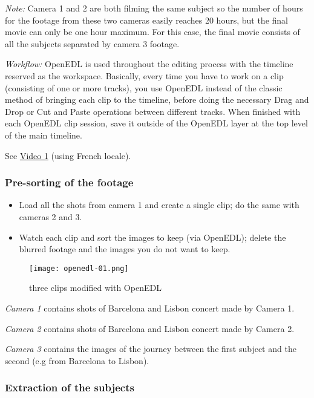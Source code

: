 \textit{Note:} Camera 1 and 2 are both filming the same subject so the number of hours for the footage from these two cameras easily reaches 20 hours, but the final movie can only be one hour maximum.  For this case, the final movie consists of all the subjects separated by camera 3 footage.

\textit{Workflow:} OpenEDL is used throughout the editing process with the timeline reserved as the workspace. Basically, every time you have to work on a clip (consisting of one or more tracks), you use OpenEDL instead of the classic method of bringing each clip to the timeline, before doing the necessary Drag and Drop or Cut and Paste operations between different tracks. When finished with each
OpenEDL clip session, save it outside of the OpenEDL layer at the top level of the main timeline.

See \href{https://youtu.be/0li5DdeQ6_o}{Video 1} (using French locale).


\subsubsection*{Pre-sorting of the footage}
\label{ssub:pre_sorting_footage}

	\begin{itemize}
		\item Load all the shots from camera 1 and create a single clip; do the same with cameras 2 and 3.
		\item Watch each clip and sort the images to keep (via OpenEDL); delete the blurred footage and the images you do not want to keep.
	\end{itemize}

\begin{figure}[htpb]
	\centering
	\texttt{[image: openedl-01.png]}
	\caption{three clips modified with OpenEDL}
	\label{fig:openedl-01}
\end{figure}

\textit{Camera 1} contains shots of Barcelona and Lisbon concert made by Camera 1.

\textit{Camera 2} contains shots of Barcelona and Lisbon concert made by Camera 2.

\textit{Camera 3} contains the images of the journey between the first subject and the second (e.g from Barcelona to Lisbon).

\subsubsection*{Extraction of the subjects}
\label{ssub:extraction_subjects}

